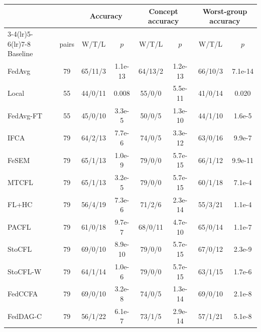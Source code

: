\small
\begin{tabular}{lccccccc}
\toprule
& & \multicolumn{2}{c}{Accuracy} & \multicolumn{2}{c}{Concept accuracy} & \multicolumn{2}{c}{Worst-group accuracy} \\
\cmidrule(lr){3-4}\cmidrule(lr){5-6}\cmidrule(lr){7-8}
Baseline & pairs & W/T/L & $p$ & W/T/L & $p$ & W/T/L & $p$ \\
\midrule
FedAvg & 79 & 65/11/3 & 1.1e-13 & 64/13/2 & 1.2e-13 & 66/10/3 & 7.1e-14 \\
Local & 55 & 44/0/11 & 0.008 & 55/0/0 & 5.5e-11 & 41/0/14 & 0.020 \\
FedAvg-FT & 55 & 45/0/10 & 3.3e-5 & 50/0/5 & 1.3e-10 & 44/1/10 & 1.6e-5 \\
IFCA & 79 & 64/2/13 & 7.7e-6 & 74/0/5 & 3.3e-12 & 63/0/16 & 9.9e-7 \\
FeSEM & 79 & 65/1/13 & 1.0e-9 & 79/0/0 & 5.7e-15 & 66/1/12 & 9.9e-11 \\
MTCFL & 79 & 65/1/13 & 3.2e-5 & 79/0/0 & 5.7e-15 & 60/1/18 & 7.1e-4 \\
FL+HC & 79 & 56/4/19 & 7.3e-6 & 71/2/6 & 2.3e-14 & 55/3/21 & 1.1e-4 \\
PACFL & 79 & 61/0/18 & 9.7e-7 & 68/0/11 & 4.7e-10 & 65/0/14 & 1.1e-7 \\
StoCFL & 79 & 69/0/10 & 8.9e-10 & 79/0/0 & 5.7e-15 & 67/0/12 & 2.3e-9 \\
StoCFL-W & 79 & 64/1/14 & 1.0e-6 & 79/0/0 & 5.7e-15 & 63/1/15 & 1.7e-6 \\
FedCCFA & 79 & 69/0/10 & 3.2e-8 & 74/0/5 & 1.3e-14 & 69/0/10 & 2.1e-8 \\
FedDAG-C & 79 & 56/1/22 & 6.1e-7 & 73/1/5 & 2.9e-14 & 57/1/21 & 5.1e-8 \\
\bottomrule
\end{tabular}
